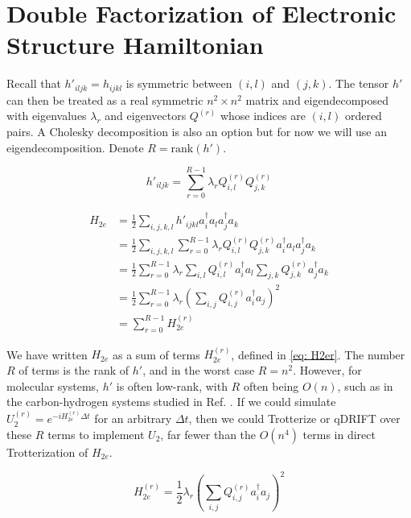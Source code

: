 \section{Double Factorization of Electronic Structure Hamiltonian}

Recall that $h'_{iljk} = h_{ijkl}$ is symmetric between $(i, l)$ and $(j, k)$. The tensor $h'$ can then be treated as a real symmetric $n^2 \times n^2$ matrix \cite{DF} and eigendecomposed with eigenvalues $\lambda_r$ and eigenvectors $Q^{(r)}$ whose indices are $(i, l)$ ordered pairs. A Cholesky decomposition is also an option but for now we will use an eigendecomposition. Denote $R = \text{rank}{(h')}$.

\begin{equation}
    h'_{iljk} = \sum_{r = 0}^{R - 1} \lambda_r Q^{(r)}_{i, l}Q^{(r)}_{j, k}
\end{equation}

\begin{equation}
    \begin{split}
        H_{2e} &= \frac{1}{2}\sum_{i,j,k,l} h'_{ijkl}a^\dag_ia_la^\dag_ja_k \\
        &= \frac{1}{2}\sum_{i,j,k,l} \sum_{r = 0}^{R - 1} \lambda_r Q^{(r)}_{i, l}Q^{(r)}_{j, k}a^\dag_ia_la^\dag_ja_k \\
        &= \frac{1}{2}\sum_{r = 0}^{R - 1} \lambda_r \sum_{i,l} Q^{(r)}_{i, l}a^\dag_ia_l\sum_{j,k}Q^{(r)}_{j, k}a^\dag_ja_k \\
        &= \frac{1}{2}\sum_{r = 0}^{R - 1}\lambda_r\left(\sum_{i,j} Q^{(r)}_{i, j}a^\dag_ia_j\right)^2 \\
        &= \sum_{r = 0}^{R - 1} H_{2e}^{(r)}
    \end{split}
    \label{eq: DF}
\end{equation}

We have written $H_{2e}$ as a sum of terms $H_{2e}^{(r)}$, defined in \eqref{eq: H2er}. The number $R$ of terms is the rank of $h'$, and in the worst case $R = n^2$. However, for molecular systems, $h'$ is often low-rank, with $R$ often being $O(n)$, such as in the carbon-hydrogen systems studied in Ref. \cite{CH}. If we could simulate $U_2^{(r)} = e^{-iH_{2e}^{(r)}\Delta t}$ for an arbitrary $\Delta t$, then we could Trotterize or qDRIFT over these $R$ terms to implement $U_2$, far fewer than the $O(n^4)$ terms in direct Trotterization of $H_{2e}$.

\begin{equation}
    H_{2e}^{(r)} = \frac{1}{2}\lambda_r\left(\sum_{i,j} Q^{(r)}_{i, j}a^\dag_ia_j\right)^2 \label{eq: H2er}
\end{equation}

